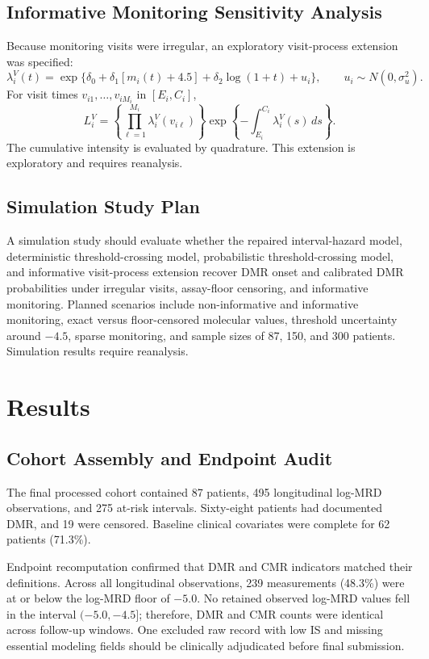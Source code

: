 \documentclass[11pt]{article}
\begin{document}
\subsection{Informative Monitoring Sensitivity Analysis}

Because monitoring visits were irregular, an exploratory visit-process extension was specified:
\[
\lambda_i^V(t)=
\exp\{\delta_0+\delta_1[m_i(t)+4.5]+\delta_2\log(1+t)+u_i\},
\qquad u_i\sim N(0,\sigma_u^2).
\]
For visit times \(v_{i1},\ldots,v_{iM_i}\) in \([E_i,C_i]\),
\[
L_i^V=
\left\{\prod_{\ell=1}^{M_i}\lambda_i^V(v_{i\ell})\right\}
\exp\left\{-\int_{E_i}^{C_i}\lambda_i^V(s)\,ds\right\}.
\]
The cumulative intensity is evaluated by quadrature. This extension is exploratory and requires reanalysis.

\subsection{Simulation Study Plan}

A simulation study should evaluate whether the repaired interval-hazard model, deterministic threshold-crossing model, probabilistic threshold-crossing model, and informative visit-process extension recover DMR onset and calibrated DMR probabilities under irregular visits, assay-floor censoring, and informative monitoring. Planned scenarios include non-informative and informative monitoring, exact versus floor-censored molecular values, threshold uncertainty around \(-4.5\), sparse monitoring, and sample sizes of 87, 150, and 300 patients. Simulation results require reanalysis.

\section{Results}

\subsection{Cohort Assembly and Endpoint Audit}

The final processed cohort contained 87 patients, 495 longitudinal log-MRD observations, and 275 at-risk intervals. Sixty-eight patients had documented DMR, and 19 were censored. Baseline clinical covariates were complete for 62 patients (71.3\%).



Endpoint recomputation confirmed that DMR and CMR indicators matched their definitions. Across all longitudinal observations, 239 measurements (48.3\%) were at or below the log-MRD floor of \(-5.0\). No retained observed log-MRD values fell in the interval \((-5.0,-4.5]\); therefore, DMR and CMR counts were identical across follow-up windows. One excluded raw record with low IS and missing essential modeling fields should be clinically adjudicated before final submission.
\end{document}
